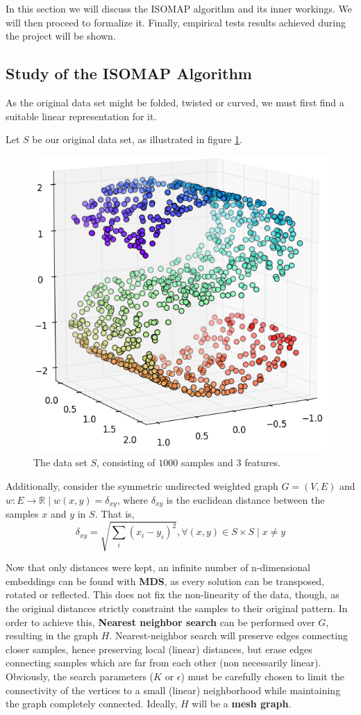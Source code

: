 \documentclass[12pt]{report}
\begin{document}
In this section we will discuss the ISOMAP algorithm and its inner workings. We will then proceed to formalize it. Finally, empirical tests results achieved during the project will be shown.

\subsection{Study of the ISOMAP Algorithm}
\label{sec:studying_ISOMAP}

As the original data set might be folded, twisted or curved, \cite{ten2000} we must first find a suitable linear representation for it.

Let $S$ be our original data set, as illustrated in figure \ref{fig:mani_s}.

\begin{figure}[H]
	\centering
	\captionsetup{justification=centering}
	\includegraphics[width=.5\linewidth]{datasets/s}
	\caption{The data set $S$, consisting of $1000$ samples and $3$ features.}
	\label{fig:mani_s}
\end{figure}

Additionally, consider the symmetric undirected weighted graph $G=(V, E)$ and $w \colon E \to \mathbb{R} \mid w(x, y) = \delta_{xy}$, where $\delta_{xy}$ is the euclidean distance between the samples $x$ and $y$ in $S$. That is,
$$\delta_{xy} = \sqrt{\sum_{i} (x_i - y_i)^2}, \forall (x, y) \in S\times S \mid x\ne y$$

Now that only distances were kept, an infinite number of n-dimensional embeddings can be found with \textbf{MDS}, as every solution can be transposed, rotated or reflected. This does not fix the non-linearity of the data, though, as the original distances strictly constraint the samples to their original pattern. In order to achieve this, \textbf{Nearest neighbor search} can be performed over $G$, resulting in the graph $H$. Nearest-neighbor search will preserve edges connecting closer samples, hence preserving local (linear) distances, but erase edges connecting samples which are far from each other (non necessarily linear). Obviously, the search parameters ($K$ or $\epsilon$) must be carefully chosen to limit the connectivity of the vertices to a small (linear) neighborhood while maintaining the graph completely connected. Ideally, $H$ will be a \textbf{mesh graph}.
\end{document}
